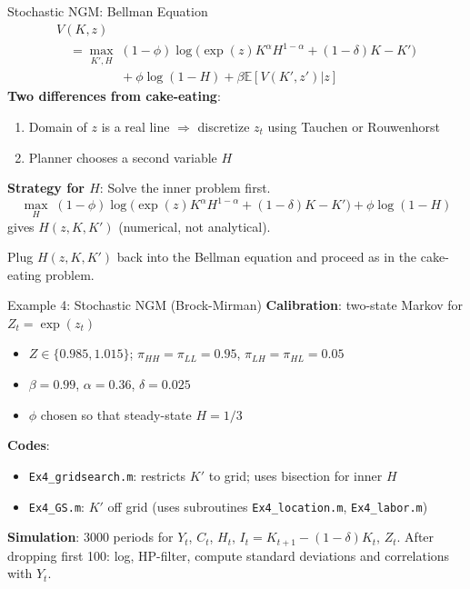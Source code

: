 \documentclass[blue]{beamer}
\newcommand{\E}{\mathbb{E}}
\begin{document}
\begin{frame}{Stochastic NGM: Bellman Equation}
	\vspace{-20pt}
	\[
	\begin{array}{l}
	V(K, z)\\ \quad\displaystyle= \max_{K', H}\; (1-\phi) \log\!\bigl(\exp(z) K^\alpha H^{1-\alpha} + (1-\delta)K - K'\bigr)\\
	 \quad\quad\quad\quad\quad \displaystyle+ \phi \log(1 - H) + \beta \E[V(K', z') | z]
	\end{array}
	\]
	\textbf{Two differences from cake-eating}:
	\begin{enumerate}
		\item Domain of $z$ is a real line $\Rightarrow$ discretize $z_t$ using Tauchen or Rouwenhorst
		\item Planner chooses a second variable $H$
	\end{enumerate}
	\textbf{Strategy for $H$}: Solve the inner problem first.
	\[
	\max_{H}\; (1-\phi) \log\!\bigl(\exp(z) K^\alpha H^{1-\alpha} + (1-\delta)K - K'\bigr) + \phi \log(1-H)
	\]
	gives $H(z, K, K')$ (numerical, not analytical).
	
	Plug $H(z, K, K')$ back into the Bellman equation and proceed as in the cake-eating problem.
\end{frame}

\begin{frame}{Example 4: Stochastic NGM (Brock-Mirman)}
	\textbf{Calibration}: two-state Markov for $Z_t = \exp(z_t)$
	\begin{itemize}
		\item $Z \in \{0.985, 1.015\}$; $\pi_{HH} = \pi_{LL} = 0.95$, $\pi_{LH} = \pi_{HL} = 0.05$
		\item $\beta = 0.99$, $\alpha = 0.36$, $\delta = 0.025$
		\item $\phi$ chosen so that steady-state $H = 1/3$
	\end{itemize}
	
	\bigskip
	\textbf{Codes}:
	\begin{itemize}
		\item \texttt{Ex4\_gridsearch.m}: restricts $K'$ to grid; uses bisection for inner $H$
		\item \texttt{Ex4\_GS.m}: $K'$ off grid (uses subroutines \texttt{Ex4\_location.m}, \texttt{Ex4\_labor.m})
	\end{itemize}
	
	\bigskip
	\textbf{Simulation}: 3000 periods for $Y_t$, $C_t$, $H_t$, $I_t = K_{t+1} - (1-\delta) K_t$, $Z_t$. After dropping first 100: log, HP-filter, compute standard deviations and correlations with $Y_t$.
\end{frame}
\end{document}
